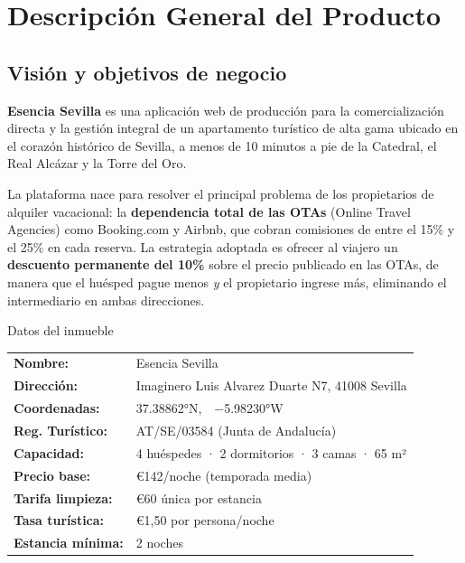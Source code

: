 \documentclass[12pt,a4paper,twoside,openright]{report}
\begin{document}
\cleardoublepage
\tableofcontents
\clearpage
\listoftables
\clearpage
\listoffigures

\mainmatter

\chapter{Descripción General del Producto}

\section{Visión y objetivos de negocio}

\textbf{Esencia Sevilla} es una aplicación web de producción para la comercialización
directa y la gestión integral de un apartamento turístico de alta gama ubicado en el
corazón histórico de Sevilla, a menos de 10 minutos a pie de la Catedral, el Real Alcázar
y la Torre del Oro.

La plataforma nace para resolver el principal problema de los propietarios de alquiler
vacacional: la \textbf{dependencia total de las OTAs} (Online Travel Agencies) como
Booking.com y Airbnb, que cobran comisiones de entre el 15\% y el 25\% en cada reserva.
La estrategia adoptada es ofrecer al viajero un \textbf{descuento permanente del 10\%}
sobre el precio publicado en las OTAs, de manera que el huésped pague menos \emph{y}
el propietario ingrese más, eliminando el intermediario en ambas direcciones.

\begin{infobox}{Datos del inmueble}
\begin{tabular}{@{}L{4cm}L{7.5cm}@{}}
  \textbf{Nombre:}         & Esencia Sevilla \\[3pt]
  \textbf{Dirección:}      & Imaginero Luis Alvarez Duarte N7, 41008 Sevilla \\[3pt]
  \textbf{Coordenadas:}    & 37.38862°N,\ \ −5.98230°W \\[3pt]
  \textbf{Reg. Turístico:} & AT/SE/03584 (Junta de Andalucía) \\[3pt]
  \textbf{Capacidad:}      & 4 huéspedes · 2 dormitorios · 3 camas · 65 m² \\[3pt]
  \textbf{Precio base:}    & \euro{}142/noche (temporada media) \\[3pt]
  \textbf{Tarifa limpieza:}& \euro{}60 única por estancia \\[3pt]
  \textbf{Tasa turística:} & \euro{}1,50 por persona/noche \\[3pt]
  \textbf{Estancia mínima:}& 2 noches \\
\end{tabular}
\end{infobox}
\end{document}
